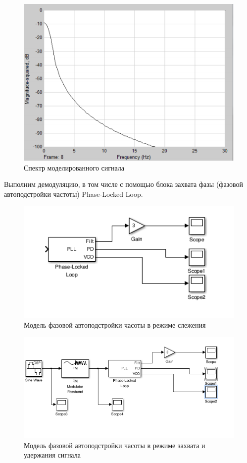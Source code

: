 \begin{figure}[H]

\includegraphics[width=150mm, scale = 0.9]{lab8/8_10}
   \caption{Спектр моделированного сигнала}

\end{figure}
Выполним демодуляцию, в том числе с помощью блока захвата фазы (фазовой автоподстройки частоты) Phase-Locked Loop.
\begin{figure}[H]

\includegraphics[width=150mm, scale = 0.9]{lab8/8_11}
   \caption{Модель фазовой автоподстройки часоты в режиме слежения}

\end{figure}
\begin{figure}[H]

\includegraphics[width=150mm, scale = 0.9]{lab8/8_12}
   \caption{Модель фазовой автоподстройки часоты в режиме захвата и удержания сигнала}

\end{figure}
